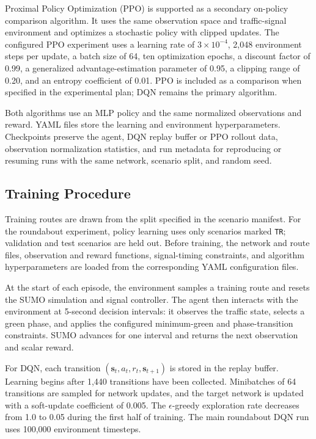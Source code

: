 Proximal Policy Optimization (PPO) is supported as a secondary on-policy comparison algorithm. It uses the same observation space and traffic-signal environment and optimizes a stochastic policy with clipped updates. The configured PPO experiment uses a learning rate of $3\times10^{-4}$, 2,048 environment steps per update, a batch size of 64, ten optimization epochs, a discount factor of 0.99, a generalized advantage-estimation parameter of 0.95, a clipping range of 0.20, and an entropy coefficient of 0.01. PPO is included as a comparison when specified in the experimental plan; DQN remains the primary algorithm.

Both algorithms use an MLP policy and the same normalized observations and reward. YAML files store the learning and environment hyperparameters. Checkpoints preserve the agent, DQN replay buffer or PPO rollout data, observation normalization statistics, and run metadata for reproducing or resuming runs with the same network, scenario split, and random seed.
\subsection{Training Procedure}
Training routes are drawn from the split specified in the scenario manifest. For the roundabout experiment, policy learning uses only scenarios marked \texttt{TR}; validation and test scenarios are held out. Before training, the network and route files, observation and reward functions, signal-timing constraints, and algorithm hyperparameters are loaded from the corresponding YAML configuration files.

At the start of each episode, the environment samples a training route and resets the SUMO simulation and signal controller. The agent then interacts with the environment at 5-second decision intervals: it observes the traffic state, selects a green phase, and applies the configured minimum-green and phase-transition constraints. SUMO advances for one interval and returns the next observation and scalar reward.

For DQN, each transition $(\mathbf{s}_t,a_t,r_t,\mathbf{s}_{t+1})$ is stored in the replay buffer. Learning begins after 1,440 transitions have been collected. Minibatches of 64 transitions are sampled for network updates, and the target network is updated with a soft-update coefficient of 0.005. The $\epsilon$-greedy exploration rate decreases from 1.0 to 0.05 during the first half of training. The main roundabout DQN run uses 100,000 environment timesteps.

